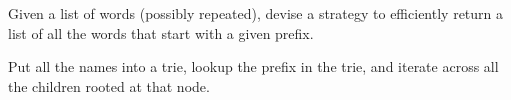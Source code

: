 \begin{blocksection}
\question Given a list of words (possibly repeated), devise a strategy to
efficiently return a list of all the words that start with a given prefix.

\begin{solution}[1.5in]
Put all the names into a trie, lookup the prefix in the trie, and iterate
across all the children rooted at that node.
\end{solution}
\end{blocksection}